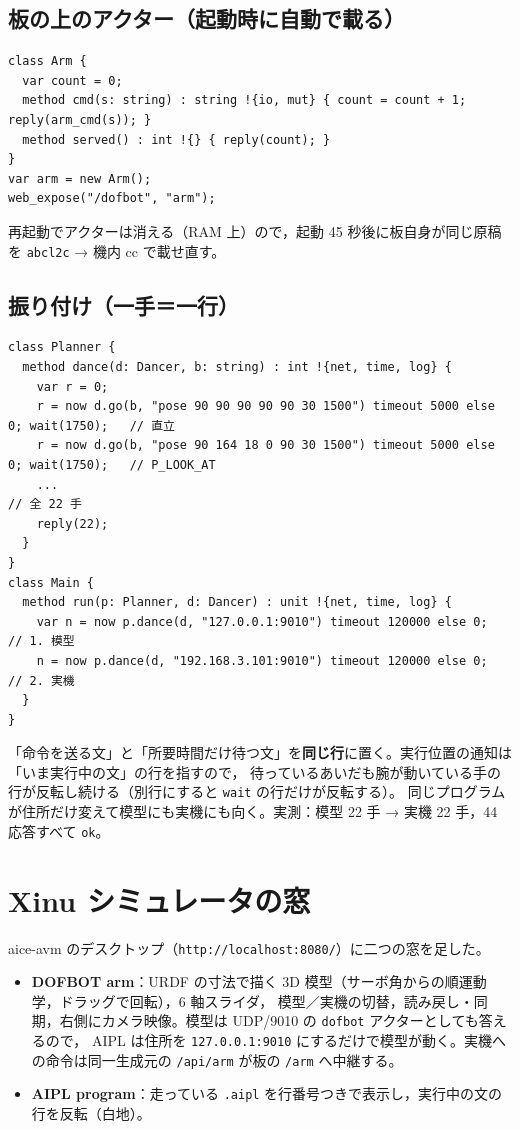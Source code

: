 \documentclass[a4paper,11pt]{article}
\begin{document}
\subsection*{板の上のアクター（起動時に自動で載る）}
\begin{lstlisting}[basicstyle=\ttfamily\footnotesize]
class Arm {
  var count = 0;
  method cmd(s: string) : string !{io, mut} { count = count + 1; reply(arm_cmd(s)); }
  method served() : int !{} { reply(count); }
}
var arm = new Arm();
web_expose("/dofbot", "arm");
\end{lstlisting}
再起動でアクターは消える（RAM 上）ので，起動 45 秒後に板自身が同じ原稿を \texttt{abcl2c} → 機内 cc で載せ直す。

\subsection*{振り付け（一手＝一行）}
\begin{lstlisting}[basicstyle=\ttfamily\footnotesize]
class Planner {
  method dance(d: Dancer, b: string) : int !{net, time, log} {
    var r = 0;
    r = now d.go(b, "pose 90 90 90 90 90 30 1500") timeout 5000 else 0; wait(1750);   // 直立
    r = now d.go(b, "pose 90 164 18 0 90 30 1500") timeout 5000 else 0; wait(1750);   // P_LOOK_AT
    ...                                                                                // 全 22 手
    reply(22);
  }
}
class Main {
  method run(p: Planner, d: Dancer) : unit !{net, time, log} {
    var n = now p.dance(d, "127.0.0.1:9010") timeout 120000 else 0;      // 1. 模型
    n = now p.dance(d, "192.168.3.101:9010") timeout 120000 else 0;      // 2. 実機
  }
}
\end{lstlisting}
「命令を送る文」と「所要時間だけ待つ文」を\textbf{同じ行}に置く。実行位置の通知は「いま実行中の文」の行を指すので，
待っているあいだも腕が動いている手の行が反転し続ける（別行にすると \texttt{wait} の行だけが反転する）。
同じプログラムが住所だけ変えて模型にも実機にも向く。実測：模型 22 手 → 実機 22 手，44 応答すべて \texttt{ok}。

\section{Xinu シミュレータの窓}\label{sec:desktop}
aice-avm のデスクトップ（\texttt{http://localhost:8080/}）に二つの窓を足した。
\begin{itemize}
  \item \textbf{DOFBOT arm}：URDF の寸法で描く 3D 模型（サーボ角からの順運動学，ドラッグで回転），6 軸スライダ，
        模型／実機の切替，読み戻し・同期，右側にカメラ映像。模型は UDP/9010 の \texttt{dofbot} アクターとしても答えるので，
        AIPL は住所を \texttt{127.0.0.1:9010} にするだけで模型が動く。実機への命令は同一生成元の \texttt{/api/arm} が板の \texttt{/arm} へ中継する。
  \item \textbf{AIPL program}：走っている \texttt{.aipl} を行番号つきで表示し，実行中の文の行を反転（白地）。
\end{itemize}
\end{document}
